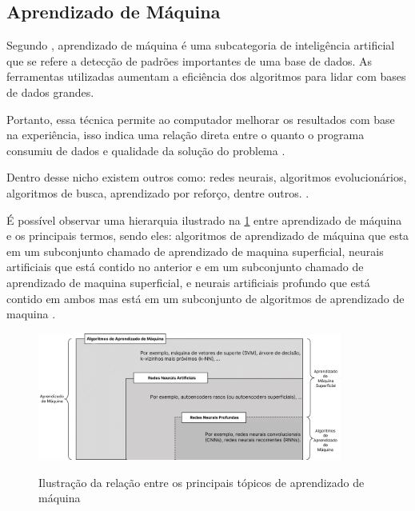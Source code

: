 \subsection{Aprendizado de Máquina}

Segundo , aprendizado de máquina é uma subcategoria de inteligência artificial que se refere  a detecção de padrões importantes de uma base de dados. As ferramentas utilizadas aumentam a eficiência dos algoritmos para lidar com bases de dados grandes.

Portanto, essa técnica permite ao computador melhorar os resultados com base na experiência, isso indica uma relação direta entre o quanto o programa consumiu de dados e qualidade da solução do problema \cite{ml_explicado}.

Dentro desse nicho existem outros como: redes neurais, algoritmos evolucionários, algoritmos de busca, aprendizado por reforço, dentre outros. \cite{ml_oil_gas_industry}.

É possível observar uma hierarquia ilustrado na \cref{fig:diagrama_ann} entre aprendizado de máquina e os principais termos, sendo eles: algoritmos de aprendizado de máquina que esta em um subconjunto chamado de aprendizado de maquina superficial, neurais artificiais que está contido no anterior e em um subconjunto chamado de aprendizado de maquina superficial, e neurais artificiais profundo que está contido em ambos mas está em um subconjunto de algoritmos de aprendizado de maquina \cite{ml_and_dp}.

\begin{figure}[ht]
	\caption{Ilustração da relação entre os principais tópicos de aprendizado de máquina}
	\centering %
	\includegraphics[width=10cm]{figures/diagrama_ann.png} %
	\label{fig:diagrama_ann}
\end{figure}
